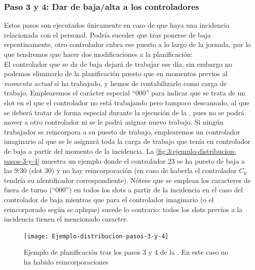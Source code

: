 \subsubsection{Paso 3 y 4: Dar de baja/alta a los controladores}
Estos pasos son ejecutados únicamente en caso de que haya una incidencia relacionada con el personal. Podría suceder que tras ponerse de baja repentinamente, otro controlador cubra ese puesto a lo largo de la jornada, por lo que tendremos que hacer dos modificaciones a la planificación:
\\

El controlador que se da de baja dejará de trabajar ese día, sin embargo no podemos eliminarlo de la planificación puesto que en momentos previos al \textit{momento actual} si ha trabajado, y hemos de contabilizarlo como carga de trabajo. Emplearemos el carácter especial ``000'' para indicar que se trata de un slot en el que el controlador no está trabajando pero tampoco descansado, al que se deberá tratar de forma especial durante la ejecución de la \fasedos{}, pues no se podrá mover a otro controlador ni se le podrá asignar nuevo trabajo. Si ningún trabajador se reincorpora a su puesto de trabajo, emplearemos un controlador imaginario al que se le asignará toda la carga de trabajo que tenía en controlador de baja a partir del momento de la incidencia. La \autoref{fig:3:ejemplo-distribucion-pasos-3-y-4} muestra un ejemplo donde el controlador 23 se ha puesto de baja a las 9:30 (slot 30) y no hay reincorporación (en caso de haberla el controlador $C_0$ tendría su identificador correspondiente). Nótese que se emplean los caracteres de fuera de turno (``000'') en todos los slots a partir de la incidencia en el caso del controlador de baja mientras que para el controlador imaginario (o el reincorporado según se aplique) sucede lo contrario: todos los slots previos a la incidencia tienen el mencionado caracter. 

\begin{figure}
	\centering
	\texttt{[image: Ejemplo-distribucion-pasos-3-y-4]}
	\caption[Ejemplo de planificación tras los pasos 3 y 4 de la \faseuno{}]{Ejemplo de planificación tras los pasos 3 y 4 de la \faseuno{}. En este caso no ha habido reincorporaciones}
	\label{fig:3:ejemplo-distribucion-pasos-3-y-4}
\end{figure}

